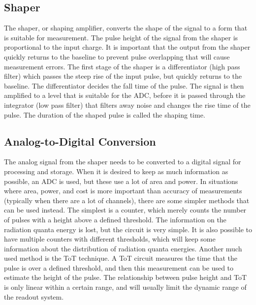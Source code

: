 \documentclass[../main/thesis.tex]{subfiles}
\begin{document}
\subsection{Shaper}
\label{t-shaper}
The shaper, or shaping amplifier, converts the shape of the signal to a form that is suitable for measurement. The pulse height of the signal from the shaper is proportional to the input charge. It is important that the output from the shaper quickly returns to the baseline to prevent pulse overlapping that will cause measurement errors. The first stage of the shaper is a differentiator (high pass filter) which passes the steep rise of the input pulse, but quickly returns to the baseline. The differentiator decides the fall time of the pulse. The signal is then amplified to a level that is suitable for the \gls{ADC}, before it is passed through the integrator (low pass filter) that filters away noise and changes the rise time of the pulse. The duration of the shaped pulse is called the shaping time. \citep[chap. 16]{Knoll}


\subsection{Analog-to-Digital Conversion}
\label{t-adc}
The analog signal from the shaper needs to be converted to a digital signal for processing and storage. When it is desired to keep as much information as possible, an \gls{ADC} is used, but these use a lot of area and power. In situations where area, power, and cost is more important than accuracy of measurements (typically when there are a lot of channels), there are some simpler methods that can be used instead. The simplest is a counter, which merely counts the number of pulses with a height above a defined threshold. The information on the radiation quanta energy is lost, but the circuit is very simple. It is also possible to have multiple counters with different thresholds, which will keep some information about the distribution of radiation quanta energies. Another much used method is the \gls{ToT} technique. A \gls{ToT} circuit measures the time that the pulse is over a defined threshold, and then this measurement can be used to estimate the height of the pulse. The relationship between pulse height and \gls{ToT} is only linear within a certain range, and will usually limit the dynamic range of the readout system. \citep[chap. 6]{ToT}

\end{document}
